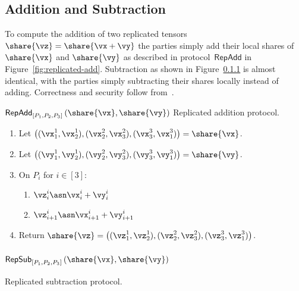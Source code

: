 \subsection{Addition and Subtraction}

To compute the addition of two replicated tensors $\share{\vz} = \share{\vx + \vy}$
the parties simply add their local shares of $\share{\vx}$ and $\share{\vy}$
as described in protocol~$\mathsf{RepAdd}$ in Figure~\ref{fig:replicated-add}. Subtraction as shown in Figure~\ref{fig:replicated-sub} is almost identical, with the parties simply subtracting their shares locally instead of adding. Correctness and security follow from~\cite{CCS:ABFLNO16}.


\msubsubsection
{$\mathsf{RepAdd}_{[P_1, P_2, P_3]}\left(\share{\vx}, \share{\vy} \right)$}
\label{fig:replicated-add}
  Replicated addition protocol.

  \begin{enumerate}
  \item Let $\left( (\vx_1^1, \vx_2^1), (\vx_2^2, \vx_3^2), (\vx_3^3, \vx_1^3) \right) = \share{\vx}$.

  \item Let $\left( (\vy_1^1, \vy_2^1), (\vy_2^2, \vy_3^2), (\vy_3^3, \vy_1^3) \right) = \share{\vy}$.

  \item On $P_i$ for $i \in [3]$:
  \begin{enumerate}
    \item $\vz_i^i \asn \vx_i^i + \vy_i^i$
    \item $\vz_{i+1}^i \asn \vx_{i+1}^i + \vy_{i+1}^i$
  \end{enumerate}

  \item Return $\share{\vz} = \left( (\vz_1^1, \vz_2^1), (\vz_2^2, \vz_3^2), (\vz_3^3, \vz_1^3) \right)$.
  \end{enumerate}

\subsubsection
{$\mathsf{RepSub}_{[P_1, P_2, P_3]}\left(\share{\vx}, \share{\vy} \right)$}
\label{fig:replicated-sub}
  Replicated subtraction protocol.

